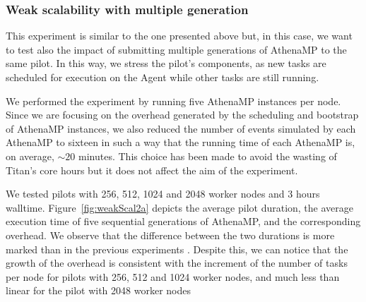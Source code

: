 \subsubsection{Weak scalability with multiple generation }

This experiment is similar to the one presented above but, in this case, we want
to test also the impact of submitting multiple generations of %
AthenaMP to the same pilot.
In this way, we stress the pilot's components, %
as new tasks are scheduled for execution on the Agent while other tasks are still running.

We performed the experiment by running five AthenaMP instances per node. %
Since we are focusing on the overhead generated by the scheduling and bootstrap of AthenaMP instances, we also reduced  the number of events simulated by each AthenaMP to sixteen in such a way that the running time of each AthenaMP is, on average, $\sim 20$ minutes.
This choice has been made to avoid the wasting of Titan's core hours but it does not affect the aim of the experiment.  

We tested
pilots
with 256, 512, 1024 and 2048 worker nodes and
3 hours walltime. Figure~\ref{fig:weakScal2a} depicts the average
pilot duration, the average execution time of five sequential
generations of AthenaMP, and the corresponding overhead. We
observe that the difference between the two durations is more marked than in the
previous experiments . Despite this, we can notice that the growth of the overhead is consistent with the increment of the number of tasks per node for pilots with 256, 512 and 1024 worker nodes, and much less than linear for the pilot with 2048 worker nodes  

